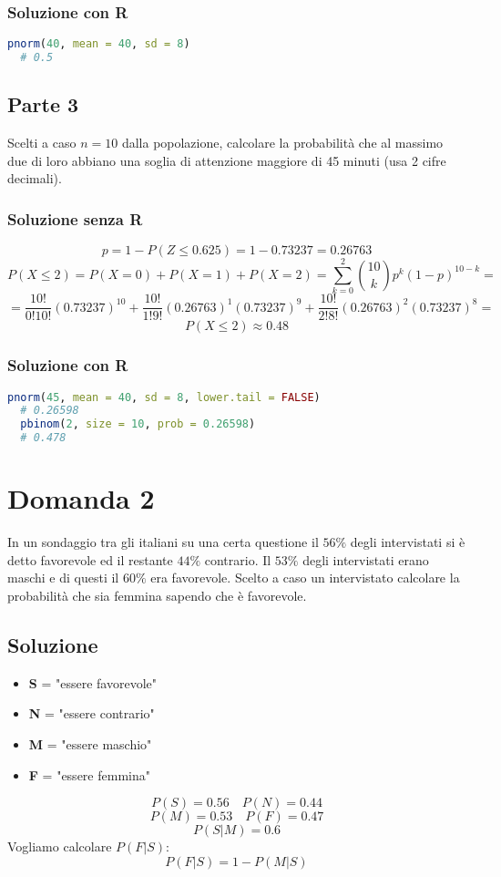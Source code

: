 \documentclass[a4paper]{article}
\theoremstyle{break}
\theoremstyle{break}
\theoremstyle{break}
\theoremstyle{break}
\begin{document}
\subsubsection{Soluzione con R}
\begin{lstlisting}[language=R]
  pnorm(40, mean = 40, sd = 8)
  # 0.5
\end{lstlisting}

\subsection{Parte 3}
Scelti a caso \( n=10 \) dalla popolazione, calcolare la probabilità 
che al massimo due di loro abbiano una soglia di attenzione 
maggiore di 45 minuti (usa 2 cifre decimali).

\subsubsection{Soluzione senza R}
\[
  p = 1 - P(Z \le 0.625) = 1 - 0.73237 = 0.26763
\] 
\[
P(X \le 2) = P(X = 0) + P(X = 1) + P(X = 2) = \sum_{k=0}^{2}
\binom{10}{k} p^k (1-p)^{10-k} =
\] 
\[
  = \frac{10!}{0!10!} (0.73237)^{10} + \frac{10!}{1!9!} (0.26763)^1 (0.73237)^9 + \frac{10!}{2!8!} (0.26763)^2 (0.73237)^8=
\] 
\[
 P(X \le 2) \approx 0.48
\] 

\subsubsection{Soluzione con R}
\begin{lstlisting}[language=R]
  pnorm(45, mean = 40, sd = 8, lower.tail = FALSE)
  # 0.26598
  pbinom(2, size = 10, prob = 0.26598)
  # 0.478
\end{lstlisting}

\section{Domanda 2}
In un sondaggio tra gli italiani su una certa questione il \( 56\% \)
degli intervistati si è detto favorevole ed il restante \( 44\% \)
contrario. Il \( 53\% \) degli intervistati erano maschi e di
questi il \( 60\% \) era favorevole. Scelto a caso un 
intervistato calcolare la probabilità che sia femmina sapendo 
che è favorevole.

\subsection{Soluzione}
\begin{itemize}
  \item \textbf{S} = "essere favorevole"
  \item \textbf{N} = "essere contrario"
  \item \textbf{M} = "essere maschio"
  \item \textbf{F} = "essere femmina"
\end{itemize}
\[
P(S) = 0.56 \quad P(N) = 0.44
\] 
\[
P(M) = 0.53 \quad P(F) = 0.47
\] 
\[
P(S|M) = 0.6
\] 
Vogliamo calcolare \( P(F|S) \):
\[
P(F|S) = 1 - P(M|S)
\] 
\end{document}
